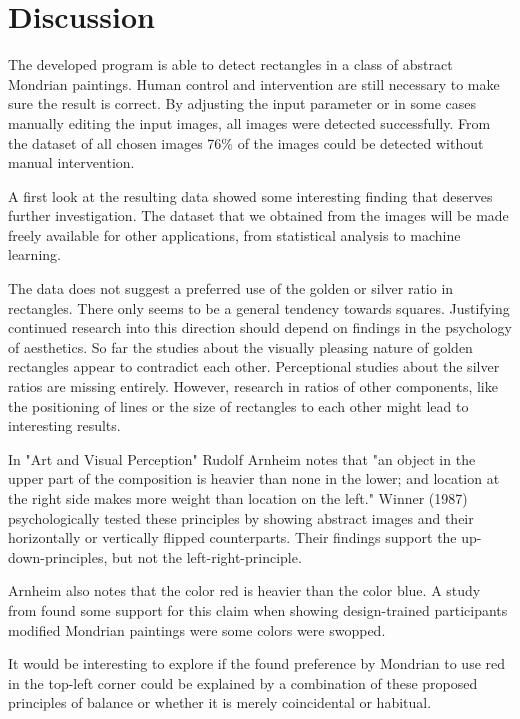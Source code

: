 \documentclass[serif,article,noparskip]{agse-thesis}
\begin{document}
\section{Discussion} \label{conclusion}

The developed program is able to detect rectangles in a class of abstract
Mondrian paintings. Human control and intervention are still necessary to make
sure the result is correct. By adjusting the input parameter or in some cases
manually editing the input images, all images were detected successfully. From
the dataset of all chosen images 76\% of the images could be detected without
manual intervention.

A first look at the resulting data showed some interesting finding that deserves
further investigation. The dataset that we obtained from the images will be made
freely available for other applications, from statistical analysis to machine
learning.

The data does not suggest a preferred use of the golden or silver ratio in
rectangles. There only seems to be a general tendency towards squares.
Justifying continued research into this direction should depend on findings in
the psychology of aesthetics. So far the studies about the visually pleasing
nature of golden rectangles appear to contradict each other. Perceptional
studies about the silver ratios are missing entirely. However, research in  ratios
of other components, like the positioning of lines or the size of rectangles to
each other might lead to interesting results.

In "Art and Visual Perception" Rudolf Arnheim \cite{Arnheim1965} notes that "an
object in the upper part of the composition is heavier than none in the lower;
and location at the right side makes more weight than location on the left."
Winner (1987) \cite{Winner1987} psychologically tested these principles by
showing abstract images and their horizontally or vertically flipped
counterparts. Their findings support the up-down-principles, but not the
left-right-principle.

Arnheim also notes that the color red is heavier than the color blue. A study
from \cite{Locher2005} found some support for this claim when showing
design-trained participants modified Mondrian paintings were some colors were
swopped.

It would be interesting to explore if the found preference by Mondrian to use
red in the top-left corner could be explained by a combination of these proposed
principles of balance or whether it is merely coincidental or habitual.
\end{document}
